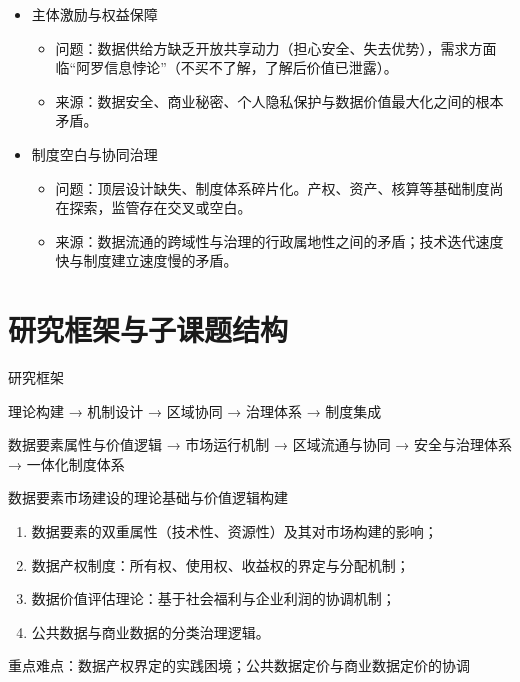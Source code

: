 \documentclass[10pt,aspectratio=169]{beamer}
\begin{document}
\begin{frame}
	\begin{itemize}
		\item 主体激励与权益保障
		\begin{itemize}
			\item 问题：数据供给方缺乏开放共享动力（担心安全、失去优势），需求方面临“阿罗信息悖论”（不买不了解，了解后价值已泄露）。
			\item 来源：数据安全、商业秘密、个人隐私保护与数据价值最大化之间的根本矛盾。
		\end{itemize}	
		\item 制度空白与协同治理
		\begin{itemize}
			\item 问题：顶层设计缺失、制度体系碎片化。产权、资产、核算等基础制度尚在探索，监管存在交叉或空白。
			\item 来源：数据流通的跨域性与治理的行政属地性之间的矛盾；技术迭代速度快与制度建立速度慢的矛盾。
		\end{itemize}
		
	\end{itemize}	
\end{frame}	



\section{研究框架与子课题结构}
\begin{frame}{研究框架}
 
理论构建 → 机制设计 → 区域协同 → 治理体系 → 制度集成


数据要素属性与价值逻辑 → 市场运行机制 → 区域流通与协同 → 安全与治理体系 → 一体化制度体系

\end{frame}	

	
\begin{frame}{数据要素市场建设的理论基础与价值逻辑构建}	
	
	\begin{enumerate}
		\item 数据要素的双重属性（技术性、资源性）及其对市场构建的影响；
		\item 数据产权制度：所有权、使用权、收益权的界定与分配机制；
		\item 数据价值评估理论：基于社会福利与企业利润的协调机制；
		\item 公共数据与商业数据的分类治理逻辑。
	\end{enumerate}
	
	重点难点：数据产权界定的实践困境；公共数据定价与商业数据定价的协调
\end{frame}		
\end{document}
